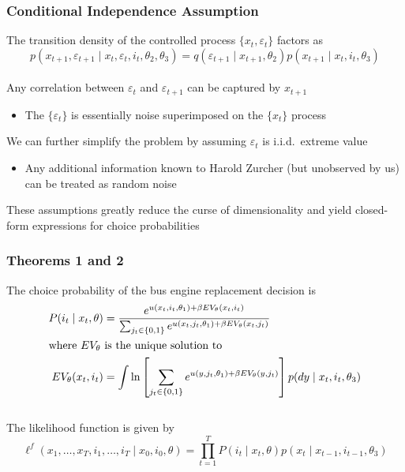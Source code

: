 \documentclass{beamer}
\begin{document}
\begin{frame}\frametitle{Conditional Independence Assumption}
    The transition density of the controlled process $\{x_t, \varepsilon_t\}$ factors as
    $$p(x_{t+1}, \varepsilon_{t+1} \mid x_t, \varepsilon_t, i_t, \theta_2, \theta_3) = q(\varepsilon_{t+1} \mid x_{t+1}, \theta_2) p(x_{t+1} \mid x_t, i_t, \theta_3)$$ \\
    \vspace{2ex}
    Any correlation between $\varepsilon_t$ and $\varepsilon_{t+1}$ can be captured by $x_{t+1}$
    \begin{itemize}
    	\item The $\{\varepsilon_t\}$ is essentially noise superimposed on the $\{x_t\}$ process
    \end{itemize}
    \vspace{2ex}
    We can further simplify the problem by assuming $\varepsilon_t$ is i.i.d.\ extreme value
    \begin{itemize}
    	\item Any additional information known to Harold Zurcher (but unobserved by us) can be treated as random noise
    \end{itemize}
    \vspace{2ex}
    These assumptions greatly reduce the curse of dimensionality and yield closed-form expressions for choice probabilities
\end{frame}

\begin{frame}\frametitle{Theorems 1 and 2}
    The choice probability of the bus engine replacement decision is
    \begin{align*}
    	P(i_t \mid x_t, \theta) &= \frac{e^{u(x_t, i_t, \theta_1) + \beta EV_{\theta}(x_t, i_t)}}{\sum_{j_t \in \{0, 1\}} e^{u(x_t, j_t, \theta_1) + \beta EV_{\theta}(x_t, j_t)}} \\
    	\intertext{where $EV_{\theta}$ is the unique solution to}
    	EV_{\theta}(x_t, i_t) &= \int \ln \left[ \sum_{j_t \in \{0, 1\}} e^{u(y, j_t, \theta_1) + \beta EV_{\theta}(y, j_t)} \right] p(dy \mid x_t, i_t, \theta_3)
    \end{align*} \\
    \vspace{2ex}
    The likelihood function is given by
    $$\ell^f(x_1, \ldots, x_T, i_1, \ldots, i_T \mid x_0, i_0, \theta) = \prod_{t = 1}^T P(i_t \mid x_t, \theta) p(x_t \mid x_{t-1}, i_{t-1}, \theta_3)$$
\end{frame}
\end{document}

